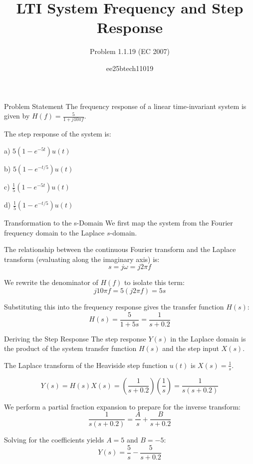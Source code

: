 \documentclass{beamer}
\title{LTI System Frequency and Step Response}
\subtitle{Problem 1.1.19 (EC 2007)}
\author{ee25btech11019}
\date{}
\begin{document}
\begin{frame}
    \titlepage
\end{frame}

\begin{frame}{Problem Statement}
    The frequency response of a linear time-invariant system is given by $H(f) = \frac{5}{1 + j10\pi f}$.
    
    The step response of the system is:
    
    \vspace{0.5cm}
    a) $5(1 - e^{-5t})u(t)$
    
    b) $5(1 - e^{-t/5})u(t)$
    
    c) $\frac{1}{5}(1 - e^{-5t})u(t)$
    
    d) $\frac{1}{5}(1 - e^{-t/5})u(t)$
\end{frame}

\begin{frame}{Transformation to the s-Domain}
    We first map the system from the Fourier frequency domain to the Laplace $s$-domain. 
    
    The relationship between the continuous Fourier transform and the Laplace transform (evaluating along the imaginary axis) is:
    \begin{equation}
        s = j\omega = j2\pi f
    \end{equation}
    
    We rewrite the denominator of $H(f)$ to isolate this term:
    \begin{equation}
        j10\pi f = 5(j2\pi f) = 5s
    \end{equation}
    
    Substituting this into the frequency response gives the transfer function $H(s)$:
    \begin{equation}
        H(s) = \frac{5}{1 + 5s} = \frac{1}{s + 0.2}
    \end{equation}
\end{frame}

\begin{frame}{Deriving the Step Response}
    The step response $Y(s)$ in the Laplace domain is the product of the system transfer function $H(s)$ and the step input $X(s)$.
    
    The Laplace transform of the Heaviside step function $u(t)$ is $X(s) = \frac{1}{s}$.
    
    \begin{equation}
        Y(s) = H(s)X(s) = \left( \frac{1}{s + 0.2} \right) \left( \frac{1}{s} \right) = \frac{1}{s(s + 0.2)}
    \end{equation}
    
    We perform a partial fraction expansion to prepare for the inverse transform:
    \begin{equation}
        \frac{1}{s(s + 0.2)} = \frac{A}{s} + \frac{B}{s + 0.2}
    \end{equation}
    
    Solving for the coefficients yields $A = 5$ and $B = -5$:
    \begin{equation}
        Y(s) = \frac{5}{s} - \frac{5}{s + 0.2}
    \end{equation}
\end{frame}
\end{document}
